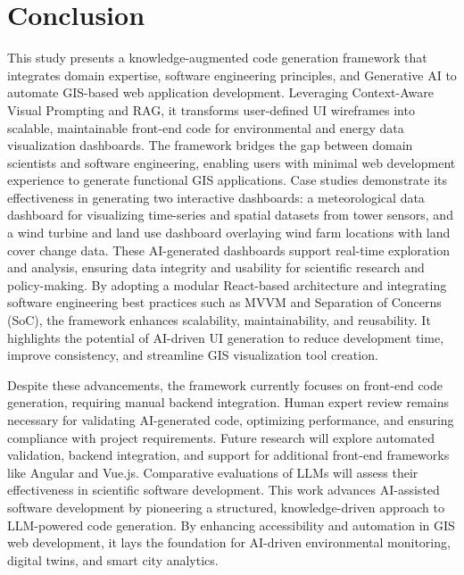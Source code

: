 \section{Conclusion}
\label{Conclusion}
This study presents a knowledge-augmented code generation framework that integrates domain expertise, software engineering principles, and Generative AI to automate GIS-based web application development. Leveraging Context-Aware Visual Prompting and RAG, it transforms user-defined UI wireframes into scalable, maintainable front-end code for environmental and energy data visualization dashboards. The framework bridges the gap between domain scientists and software engineering, enabling users with minimal web development experience to generate functional GIS applications. Case studies demonstrate its effectiveness in generating two interactive dashboards: a meteorological data dashboard for visualizing time-series and spatial datasets from tower sensors, and a wind turbine and land use dashboard overlaying wind farm locations with land cover change data. These AI-generated dashboards support real-time exploration and analysis, ensuring data integrity and usability for scientific research and policy-making. By adopting a modular React-based architecture and integrating software engineering best practices such as MVVM and Separation of Concerns (SoC), the framework enhances scalability, maintainability, and reusability. It highlights the potential of AI-driven UI generation to reduce development time, improve consistency, and streamline GIS visualization tool creation.

Despite these advancements, the framework currently focuses on front-end code generation, requiring manual backend integration. Human expert review remains necessary for validating AI-generated code, optimizing performance, and ensuring compliance with project requirements. Future research will explore automated validation, backend integration, and support for additional front-end frameworks like Angular and Vue.js. Comparative evaluations of LLMs will assess their effectiveness in scientific software development. This work advances AI-assisted software development by pioneering a structured, knowledge-driven approach to LLM-powered code generation. By enhancing accessibility and automation in GIS web development, it lays the foundation for AI-driven environmental monitoring, digital twins, and smart city analytics.